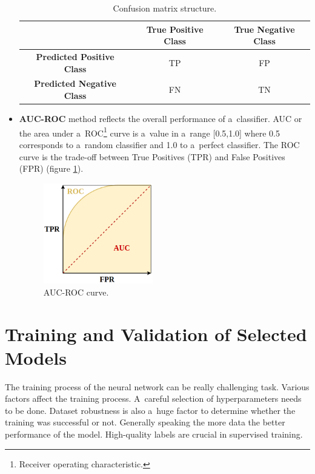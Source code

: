 \begin{itemize}
\begin{table}[!h]
\begin{center}
        \begin{tabular}{|c|c|c|}\hline 
            & \textbf{True Positive Class} & \textbf{True Negative Class} \\ \hline
            \textbf{Predicted Positive Class} & TP & FP \\ \hline
            \textbf{Predicted Negative Class} & FN & TN \\ \hline
        \end{tabular}
        \caption{Confusion matrix structure.}
        \label{confusionmatrix}
        \end{center}
        \end{table}
        \item \textbf{AUC-ROC} method reflects the overall performance of a~classifier. AUC or the area under a~ROC\footnote{Receiver operating characteristic.} curve is a~value in a~range [0.5,1.0] where 0.5 corresponds to a~random classifier and 1.0 to a~perfect classifier. The ROC curve is the trade-off between True Positives (TPR) and False Positives (FPR) (figure \ref{fig:AUCROCexample}).

        \begin{figure}[ht!]
            \centering
            \includegraphics[width = 0.45\textwidth]{obrazky-figures/AUC-ROC.png}
            \caption{AUC-ROC curve.}
            \label{fig:AUCROCexample}
        \end{figure}
    \end{itemize}

\newpage

\section{Training and Validation of Selected Models}

    The training process of the neural network can be really challenging task. Various factors affect the training process. A~careful selection of hyperparameters needs to be done. Dataset robustness is also a~huge factor to determine whether the training was successful or not. Generally speaking the more data the better performance of the model. High-quality labels are crucial in supervised training. 

